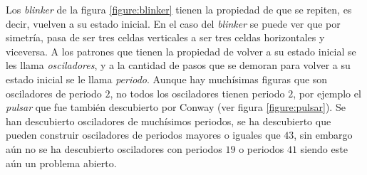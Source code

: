 Los \textit{blinker} de la figura \ref{figure:blinker} tienen la propiedad de que se repiten, es decir, vuelven a su estado inicial. En el caso del \textit{blinker} se puede ver que por simetr\'ia, pasa de ser tres celdas verticales a ser tres celdas horizontales y viceversa. A los patrones que tienen la propiedad de volver a su estado inicial se les llama \textit{osciladores}, y a la cantidad de pasos que se demoran para volver a su estado inicial se le llama \textit{periodo}. Aunque hay much\'isimas figuras que son osciladores de periodo $2$, no todos los osciladores tienen periodo $2$, por ejemplo el \textit{pulsar} que fue tambi\'en descubierto por Conway (ver figura \ref{figure:pulsar}). Se han descubierto osciladores de much\'isimos periodos, se ha descubierto que pueden construir osciladores de periodos mayores o iguales que $43$, sin embargo a\'un no se ha descubierto osciladores con periodos $19$ o periodos $41$ siendo este a\'un un problema abierto.

